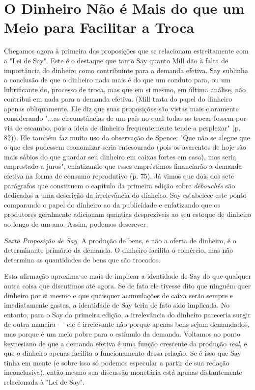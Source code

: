 \documentclass[12pt]{article}
\begin{document}
\section{O Dinheiro Não é Mais do que um Meio para Facilitar a Troca}

Chegamos agora à primeira das proposições que se relacionam estreitamente com a "Lei de Say". Este é o destaque que tanto Say quanto Mill dão à falta de importância do dinheiro como contribuinte para a demanda efetiva. Say sublinha a conclusão de que o dinheiro nada mais é do que um conduto para, ou um lubrificante do, processo de troca, mas que em si mesmo, em última análise, não contribui em nada para a demanda efetiva. (Mill trata do papel do dinheiro apenas obliquamente. Ele diz que suas proposições são vistas mais claramente considerando "...as circunstâncias de um país no qual todas as trocas fossem por via de escambo, pois a ideia de dinheiro frequentemente tende a perplexar" (p. 82)). Ele também faz muito uso da observação de Spence: "Que não se alegue que o que eles pudessem economizar seria entesourado (pois os avarentos de hoje são mais sábios do que guardar seu dinheiro em caixas fortes em casa), mas seria emprestado a juros", enfatizando que esses empréstimos financiarão a demanda efetiva na forma de consumo reprodutivo (p. 75). Já vimos que dois dos sete parágrafos que constituem o capítulo da primeira edição sobre \textit{débouchés} são dedicados a uma descrição da irrelevância do dinheiro. Say estabelece este ponto comparando o papel do dinheiro ao da publicidade e enfatizando que os produtores geralmente adicionam quantias desprezíveis ao seu estoque de dinheiro ao longo de um ano. Assim, podemos descrever:

\textit{Sexta Proposição de Say.} A produção de bens, e não a oferta de dinheiro, é o determinante primário da demanda. O dinheiro facilita o comércio, mas não determina as quantidades de bens que são trocados.

Esta afirmação aproxima-se mais de implicar a identidade de Say do que qualquer outra coisa que discutimos até agora. Se de fato ele tivesse dito que ninguém quer dinheiro por si mesmo e que quaisquer acumulações de caixa serão sempre e imediatamente gastas, a identidade de Say teria de fato sido implicada. No entanto, para o Say da primeira edição, a irrelevância do dinheiro pareceria surgir de outra maneira — ele é irrelevante não porque apenas bens sejam demandados, mas porque é um meio pobre para o estímulo da demanda. Voltamos ao ponto keynesiano de que a demanda efetiva é uma função crescente da produção \textit{real}, e que o dinheiro apenas facilita o funcionamento dessa relação. Se é isso que Say tinha em mente (e sobre isso só podemos especular a partir de sua redação inconclusiva), então mesmo sua discussão monetária está apenas distantemente relacionada à "Lei de Say".
\end{document}
